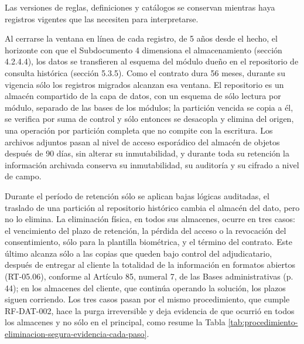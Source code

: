 \documentclass[subdoc]{../../comun/overfore}
\begin{document}
Las versiones de reglas, definiciones y catálogos se conservan mientras haya registros vigentes que las necesiten para interpretarse.

Al cerrarse la ventana en línea de cada registro, de 5 años desde el hecho, el horizonte con que el Subdocumento 4 dimensiona el almacenamiento (sección 4.2.4.4), los datos se transfieren al esquema del módulo dueño en el repositorio de consulta histórica (sección 5.3.5). Como el contrato dura 56 meses, durante su vigencia sólo los registros migrados alcanzan esa ventana. El repositorio es un almacén compartido de la capa de datos, con un esquema de sólo lectura por módulo, separado de las bases de los módulos; la partición vencida se copia a él, se verifica por suma de control y sólo entonces se desacopla y elimina del origen, una operación por partición completa que no compite con la escritura. Los archivos adjuntos pasan al nivel de acceso esporádico del almacén de objetos después de 90 días, sin alterar su inmutabilidad, y durante toda su retención la información archivada conserva su inmutabilidad, su auditoría y su cifrado a nivel de campo.

Durante el período de retención sólo se aplican bajas lógicas auditadas, el traslado de una partición al repositorio histórico cambia el almacén del dato, pero no lo elimina. La eliminación física, en todos sus almacenes, ocurre en tres casos: el vencimiento del plazo de retención, la pérdida del acceso o la revocación del consentimiento, sólo para la plantilla biométrica, y el término del contrato. Este último alcanza sólo a las copias que queden bajo control del adjudicatario, después de entregar al cliente la totalidad de la información en formatos abiertos (RT-05.06), conforme al Artículo 85, numeral 7, de las Bases administrativas (p. 44); en los almacenes del cliente, que continúa operando la solución, los plazos siguen corriendo. Los tres casos pasan por el mismo procedimiento, que cumple RF-DAT-002, hace la purga irreversible y deja evidencia de que ocurrió en todos los almacenes y no sólo en el principal, como resume la Tabla \ref{tab:procedimiento-eliminacion-segura-evidencia-cada-paso}.
\end{document}
